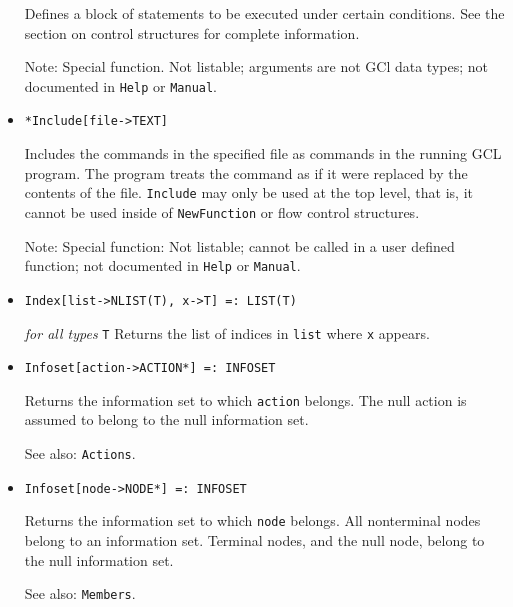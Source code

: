 \begin{itemize}
\bd
Defines a block of statements to be executed under certain conditions.
See the section on control structures for complete information. 
\item [Note:] Special function.  Not listable; arguments are not GCl
data types; not documented in \verb+Help+ or \verb+Manual+.  
\ed


\item{}
\protect \large \begin{verbatim}
*Include[file->TEXT]
\end{verbatim}\normalsize

\bd
Includes the commands in the specified file as commands
in the running GCL program.  The program treats the command as if it
were replaced by the contents of the file.  \verb+Include+ may only be used
at the top level, that is, it cannot be used inside of \verb+NewFunction+
or flow control structures.
\item [Note:] Special function:  Not listable; cannot be called in a
user defined function; not documented in \verb+Help+ or \verb+Manual+. 
\ed


\item{}
\protect \large \begin{verbatim}
Index[list->NLIST(T), x->T] =: LIST(T)
\end{verbatim} \normalsize

{\it for all types} {\tt T}
\bd
Returns the list of indices in \verb+list+ where \verb+x+ appears.
\ed

\item{}
\protect \large \begin{verbatim}
Infoset[action->ACTION*] =: INFOSET
\end{verbatim} \normalsize

\bd
Returns the information set to which \verb+action+ belongs.  The null
action is assumed to belong to the null information set.
\item [See also:] \verb+Actions+.
\ed

\item{}
\protect \large \begin{verbatim}
Infoset[node->NODE*] =: INFOSET
\end{verbatim}\normalsize

\bd
Returns the information set to which \verb+node+
belongs.  All nonterminal nodes belong to an information set. 
Terminal nodes, and the null node, belong to the null information set.
\item [See also:] \verb+Members+.
\ed


\end{itemize}
